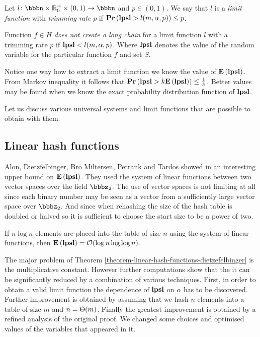 \documentclass[runningheads,a4paper]{llncs}
\begin{document}
\begin{definition}
Let $l\colon \bbbn \times \mathbb{R}_0^+ \times (0, 1) \rightarrow \bbbn$ and $p \in (0, 1)$.  We say that $l$ is a \emph{limit function} with \emph{trimming rate} $p$ if $\mathbf{Pr}\left(\mathbf{lpsl} > l(m, \alpha, p)\right) \leq p$.

Function $f \in H$ \emph{does not create a long chain} for a limit function $l$ with a trimming rate $p$ if $\mathbf{lpsl} < l(m, \alpha, p)$. Where $\mathbf{lpsl}$ denotes the value of the random variable for the particular function $f$ and set $S$.
\end{definition}

Notice one way how to extract a limit function we know the value of $\mathbf{E}\left(\mathbf{lpsl}\right)$. From Markov inequality it follows that $\mathbf{Pr}\left(\mathbf{lpsl} > k \mathbf{E}\left(\mathbf{lpsl}\right)\right) \leq \frac{1}{k}$. Better values may be found when we know the exact probability distribution function of $\mathbf{lpsl}$.

Let us discuss various universal systems and limit functions that are possible to obtain with them.

\subsection{Linear hash functions}
Alon, Dietzfelbinger, Bro Miltersen, Petrank and Tardos showed in \cite{DBLP:journals/jacm/AlonDMPT99} an interesting upper bound on $\mathbf{E}\left(\mathbf{lpsl}\right)$. They used the system of linear functions between two vector spaces over the field $\bbbz_2$. The use of vector spaces is not limiting at all since each binary number may be seen as a vector from a sufficiently large vector space over $\bbbz_2$. And since when rehashing the size of the hash table is doubled or halved so it is sufficient to choose the start size to be a power of two.

\begin{theorem}{\cite{DBLP:journals/jacm/AlonDMPT99}}
\label{theorem-linear-hash-functions-dietzefelbinger}
If $n \log n$ elements are placed into the table of size $n$ using the system of linear functions, then $\mathbf{E}\left(\mathbf{lpsl}\right) = \mathcal{O}(\log n \log \log n)$. 
\end{theorem}

The major problem of Theorem \ref{theorem-linear-hash-functions-dietzefelbinger} is the multiplicative constant. However further computations show that the it can be significantly reduced by a combination of various techniques. First, in order to obtain a valid limit function the dependence of $\mathbf{lpsl}$ on $\alpha$ has to be discovered. Further improvement is obtained by assuming that we hash $n$ elements into a table of size $m$ and $n = \mathrm{\Theta}(m)$. Finally the greatest improvement is obtained by a refined analysis of the original proof. We changed some choices and optimised values of the variables that appeared in it.
\end{document}
